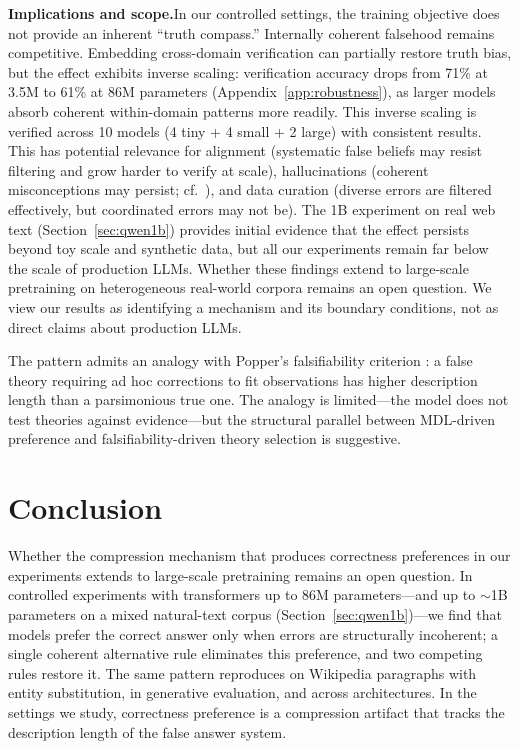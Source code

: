 \documentclass{article}
\begin{document}
\textbf{Implications and scope.}\quad In our controlled settings, the training objective does not provide an inherent ``truth compass.'' Internally coherent falsehood remains competitive. Embedding cross-domain verification can partially restore truth bias, but the effect exhibits inverse scaling: verification accuracy drops from 71\% at 3.5M to 61\% at 86M parameters (Appendix~\ref{app:robustness}), as larger models absorb coherent within-domain patterns more readily. This inverse scaling is verified across 10 models (4 tiny + 4 small + 2 large) with consistent results. This has potential relevance for alignment (systematic false beliefs may resist filtering and grow harder to verify at scale), hallucinations (coherent misconceptions may persist; cf.\ \citealp{kalai2024calibrated}), and data curation (diverse errors are filtered effectively, but coordinated errors may not be). The 1B experiment on real web text (Section~\ref{sec:qwen1b}) provides initial evidence that the effect persists beyond toy scale and synthetic data, but all our experiments remain far below the scale of production LLMs. Whether these findings extend to large-scale pretraining on heterogeneous real-world corpora remains an open question. We view our results as identifying a mechanism and its boundary conditions, not as direct claims about production LLMs.

The pattern admits an analogy with Popper's falsifiability criterion \citep{popper1959logic}: a false theory requiring ad hoc corrections to fit observations has higher description length than a parsimonious true one. The analogy is limited---the model does not test theories against evidence---but the structural parallel between MDL-driven preference and falsifiability-driven theory selection is suggestive.

\section{Conclusion}

Whether the compression mechanism that produces correctness preferences in our experiments extends to large-scale pretraining remains an open question. In controlled experiments with transformers up to 86M parameters---and up to ${\sim}$1B parameters on a mixed natural-text corpus (Section~\ref{sec:qwen1b})---we find that models prefer the correct answer only when errors are structurally incoherent; a single coherent alternative rule eliminates this preference, and two competing rules restore it. The same pattern reproduces on Wikipedia paragraphs with entity substitution, in generative evaluation, and across architectures. In the settings we study, correctness preference is a compression artifact that tracks the description length of the false answer system.
\end{document}
